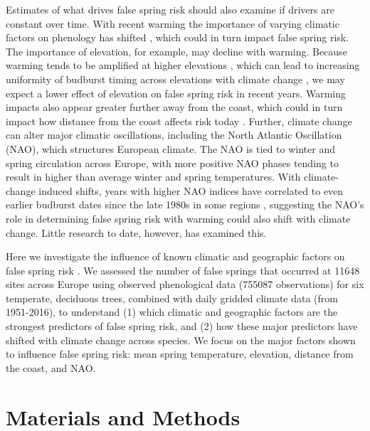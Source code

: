 \documentclass{article}\usepackage[]{graphicx}\usepackage[]{color}
\begin{document}
Estimates of what drives false spring risk should also examine if drivers are constant over time. With recent warming the importance of varying climatic factors on phenology has shifted \citep[e.g.,][]{Cook2016,Gauzere2019}, which could in turn impact false spring risk. The importance of elevation, for example, may decline with warming. Because warming tends to be amplified at higher elevations \citep{Giorgi1997,Rangwala2012,Pepin2015}, which can lead to increasing uniformity of budburst timing across elevations with climate change \citep{Vitasse2018}, we may expect a lower effect of elevation on false spring risk in recent years. Warming impacts also appear greater further away from the coast, which could in turn impact how distance from the coast affects risk today \citep{Wypych2016a,Ma2018}. Further, climate change can alter major climatic oscillations, including the North Atlantic Oscillation (NAO), which structures European climate. The NAO  is tied to winter and spring circulation across Europe, with more positive NAO phases tending to result in higher than average winter and spring temperatures. With climate-change induced shifts, years with higher NAO indices have correlated to even earlier budburst dates since the late 1980s in some regions \citep{Chmielewski2001}, suggesting the NAO's role in determining false spring risk with warming could also shift with climate change. Little research to date, however, has examined this. 

Here we investigate the influence of known climatic and geographic factors on false spring risk \citep[defined here as when temperatures fell below -2.2$^{\circ}$C between estimated budburst and leafout for all species included in the study,][]{Schwartz1993}. We assessed the number of false springs that occurred at 11648 sites across Europe using observed phenological data (755087 observations) for six temperate, deciduous trees, combined with daily gridded climate data (from 1951-2016),  to understand (1) which climatic and geographic factors are the strongest predictors of false spring risk, and (2) how these major predictors have shifted with climate change across species. We focus on the major factors shown to influence false spring risk: mean spring temperature, elevation, distance from the coast, and NAO. 

\section*{Materials and Methods} %
\end{document}
